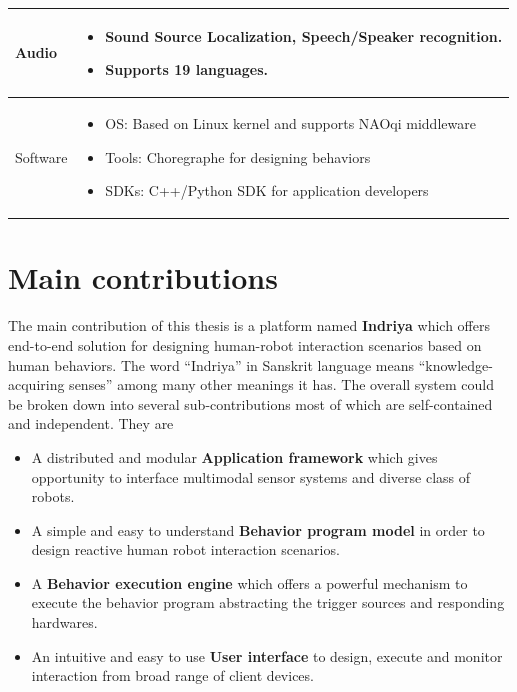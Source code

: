 \begin{table}[H]
\begin{tabular}{ | l | p{12cm} |}
  Audio & \begin{itemize}[leftmargin=*,topsep={0pt},itemsep={0pt},partopsep={0pt},parsep={0pt}] \item Sound Source Localization, Speech/Speaker recognition. \item Supports 19 languages.\end{itemize} \\
                                          \hline
  Software & \begin{itemize}[leftmargin=*,topsep={0pt},itemsep={0pt},partopsep={0pt},parsep={0pt}] \item OS: Based on Linux kernel and supports NAOqi middleware
  							\item Tools: Choregraphe \cite{Choregraphe} for designing behaviors
  							\item SDKs: C++/Python SDK for application developers \end{itemize} \\
                                          \hline
    \end{tabular}
\end{table}
\section{Main contributions}
\label{sec:contributions}
The main contribution of this thesis is a platform named \textbf{Indriya} which offers end-to-end solution for designing human-robot interaction scenarios based on human behaviors. The word ``Indriya'' in Sanskrit language means ``knowledge-acquiring senses'' among many other meanings it has. The overall system could be broken down into several sub-contributions most of which are self-contained and independent. They are
\begin{itemize}
\item A distributed and modular \textbf{Application framework} which gives opportunity to interface multimodal sensor systems and diverse class of robots.
\item A simple and easy to understand \textbf{Behavior program model} in order to design reactive human robot interaction scenarios.
\item A \textbf{Behavior execution engine} which offers a powerful mechanism to execute the behavior program abstracting the trigger sources and responding hardwares.
\item An intuitive and easy to use \textbf{User interface} to design, execute and monitor interaction from broad range of client devices.
\end{itemize}

